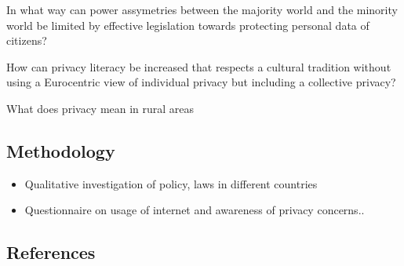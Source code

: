 \documentclass[
  letterpaper,
  DIV=11,
  numbers=noendperiod]{scrartcl}
\providecommand{\tightlist}{%
  \setlength{\itemsep}{0pt}\setlength{\parskip}{0pt}}
\begin{document}
In what way can power assymetries between the majority world and the
minority world be limited by effective legislation towards protecting
personal data of citizens?

How can privacy literacy be increased that respects a cultural tradition
without using a Eurocentric view of individual privacy but including a
collective privacy?

What does privacy mean in rural areas

\subsection{Methodology}\label{methodology}

\begin{itemize}
\tightlist
\item
  Qualitative investigation of policy, laws in different countries
\item
  Questionnaire on usage of internet and awareness of privacy concerns..
\end{itemize}

\subsection*{References}\label{references}
\end{document}
